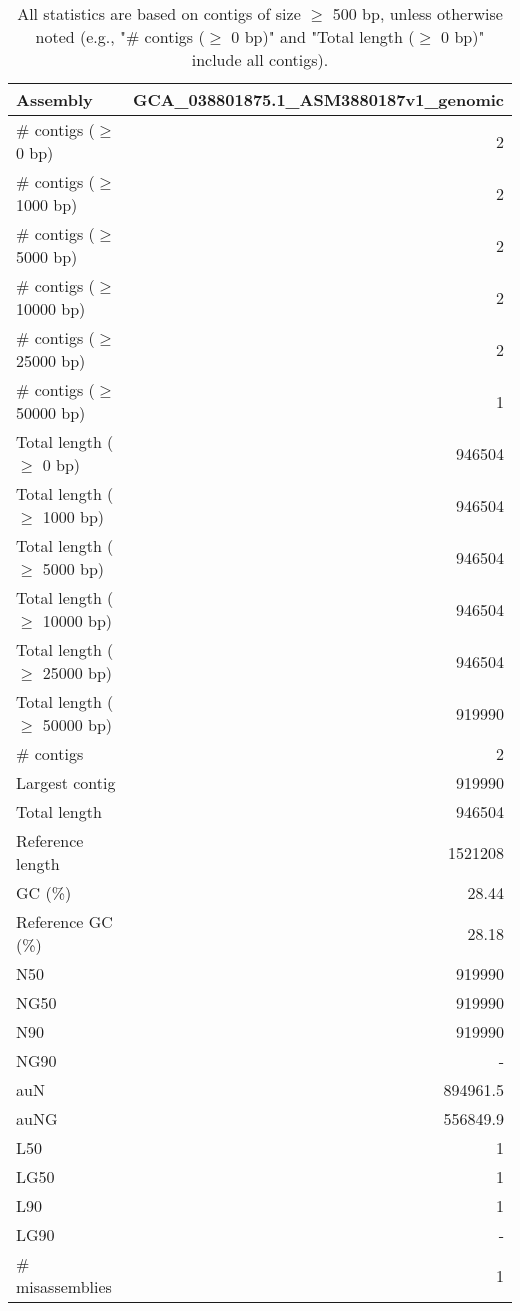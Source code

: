 \documentclass[12pt,a4paper]{article}
\begin{document}
\begin{table}[ht]
\begin{center}
\caption{All statistics are based on contigs of size $\geq$ 500 bp, unless otherwise noted (e.g., "\# contigs ($\geq$ 0 bp)" and "Total length ($\geq$ 0 bp)" include all contigs).}
\begin{tabular}{|l*{1}{|r}|}
\hline
Assembly & GCA\_038801875.1\_ASM3880187v1\_genomic \\ \hline
\# contigs ($\geq$ 0 bp) & 2 \\ \hline
\# contigs ($\geq$ 1000 bp) & 2 \\ \hline
\# contigs ($\geq$ 5000 bp) & 2 \\ \hline
\# contigs ($\geq$ 10000 bp) & 2 \\ \hline
\# contigs ($\geq$ 25000 bp) & 2 \\ \hline
\# contigs ($\geq$ 50000 bp) & 1 \\ \hline
Total length ($\geq$ 0 bp) & 946504 \\ \hline
Total length ($\geq$ 1000 bp) & 946504 \\ \hline
Total length ($\geq$ 5000 bp) & 946504 \\ \hline
Total length ($\geq$ 10000 bp) & 946504 \\ \hline
Total length ($\geq$ 25000 bp) & 946504 \\ \hline
Total length ($\geq$ 50000 bp) & 919990 \\ \hline
\# contigs & 2 \\ \hline
Largest contig & 919990 \\ \hline
Total length & 946504 \\ \hline
Reference length & 1521208 \\ \hline
GC (\%) & 28.44 \\ \hline
Reference GC (\%) & 28.18 \\ \hline
N50 & 919990 \\ \hline
NG50 & 919990 \\ \hline
N90 & 919990 \\ \hline
NG90 & - \\ \hline
auN & 894961.5 \\ \hline
auNG & 556849.9 \\ \hline
L50 & 1 \\ \hline
LG50 & 1 \\ \hline
L90 & 1 \\ \hline
LG90 & - \\ \hline
\# misassemblies & 1 \\ \hline

\end{tabular}
\end{center}
\end{table}
\end{document}
